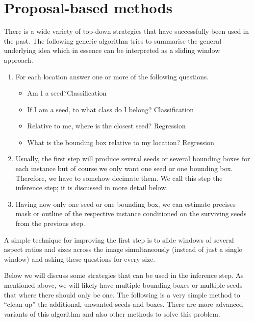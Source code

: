 \section{Proposal-based methods}
There is a wide variety of top-down strategies that have successfully been used
in the past. The following generic algorithm tries to summarise the general
underlying idea which in essence can be interpreted as a sliding window
approach.
\begin{enumerate}
\item For each location answer one or more of the following questions.
  \begin{itemize}
  \item Am I a seed?\hfill {\color{gray}Classification}
  \item If I am a seed, to what class do I belong? \hfill
    {\color{gray}Classification}
  \item Relative to me, where is the closest seed? \hfill
    {\color{gray}Regression}
  \item What is the bounding box relative to my location? \hfill
    {\color{gray}Regression}
  \end{itemize}
\item Usually, the first step will produce several seeds or several bounding
  boxes for each instance but of course we only want one seed or one bounding
  box. Therefore, we have to somehow decimate them. We call this step the
  inference step; it is discussed in more detail below.
\item Having now only one seed or one bounding box, we can estimate precises
  mask or outline of the respective instance conditioned on the surviving seeds
  from the previous step.
\end{enumerate}
A simple technique for improving the first step is to slide windows of several
aspect ratios and sizes across the image simultaneously (instead of just a
single window) and asking these questions for every size.

Below we will discuss some strategies that can be used in the inference step. As
mentioned above, we will likely have multiple bounding boxes or multiple seeds
that where there should only be one. The following is a very simple method to
``clean up'' the additional, unwanted seeds and boxes. There are more advanced
variants of this algorithm and also other methods to solve this problem.

